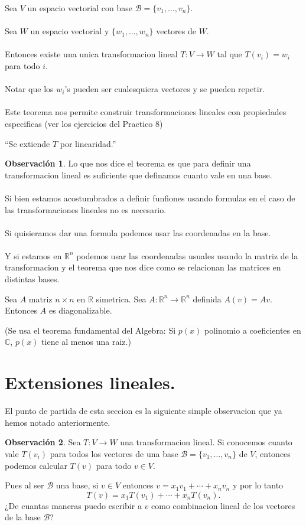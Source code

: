 \documentclass{article}
\theoremstyle{definition}
\theoremstyle{definition}
\newtheorem*{obs}{Observación}
\theoremstyle{remark}
\begin{document}
\begin{teo}
  Sea $V$ un espacio vectorial con base $\mathcal{B}=\{v_1, \dots ,v_n\}.$ \\\\ Sea $W$ un espacio vectorial y $\{w_1, \dots ,w_n\}$ vectores de $W$. \\\\ Entonces existe una unica transformacion lineal $T : V \to W$ tal que $T(v_i)=w_i$ para todo $i$. \\\\ Notar que los $w_i$'s pueden ser cualesquiera vectores y se pueden repetir. \\\\ Este teorema nos permite construir transformaciones lineales con propiedades especificas (ver los ejercicios del Practico 8)
\end{teo}
``Se extiende $T$ por linearidad.''
\begin{obs}
  Lo que nos dice el teorema es que para definir una transformacion lineal es suficiente que definamos cuanto vale en una base. \\\\ Si bien estamos acostumbrados a definir funfiones usando formulas en el caso de las transformaciones lineales no es necesario. \\\\ Si quisieramos dar una formula podemos usar las coordenadas en la base. \\\\Y si estamos en $\mathbb{R}^n$ podemos usar las coordenadas usuales usando la matriz de la transformacion y el teorema que nos dice como se relacionan las matrices en distintas bases.
\end{obs}
\begin{teo}
  Sea $A$ matriz $n \times n$ en $\mathbb{R}$ simetrica. Sea $A : \mathbb{R}^n \to \mathbb{R}^n$ definida $A(v)=Av$. Entonces $A$ es diagonalizable.
\end{teo}
(Se usa el teorema fundamental del Algebra: 
Si $p(x)$ polinomio a coeficientes en $\mathbb{C}$, $p(x)$ tiene al menos una raiz.)
\section{Extensiones lineales.}
El punto de partida de esta seccion es la siguiente simple observacion que ya hemos notado anteriormente. \begin{obs}
 Sea $T : V \to W$ una transformacion lineal. Si conocemos cuanto vale $T(v_i)$ para todos los vectores de una base $\mathcal{B}=\{v_1, \dots ,v_n\}$ de $V$, entonces podemos calcular $T(v)$ para todo $v \in V$.
\end{obs}
Pues al ser $\mathcal{B}$ una base, si $v \in V$ entonces $v=x_1 v_1 + \cdots + x_n v_n$ y por lo tanto \[
  T(v)=x_1 T(v_1) + \cdots + x_n T(v_n).
\]
¿De cuantas maneras puedo escribir a $v$ como combinacion lineal de los vectores de la base $\mathcal{B}$?\pagebreak
\end{document}
